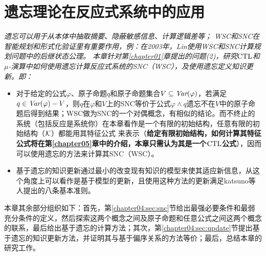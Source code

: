 
\chapter{遗忘理论在反应式系统中的应用}
\label{chapter04}

{\em
遗忘可以用于从本体中抽取摘要、隐蔽敏感信息、计算逻辑差等；
WSC和SNC在智能规划和形式化验证里有重要作用，例：在2003年，Lin使用WSC和SNC计算规划问题中的后继状态公理。
本章针对第\ref{chapter01}章提出的问题(2)，研究$\textrm{CTL}$和$\mu$-演算中如何使用遗忘计算反应式系统的SNC（WSC），及使用遗忘定义知识更新。即：
\begin{itemize}
	\item 对于给定的公式$\varphi$、原子命题$q$和原子命题集合$V\subseteq \textit{Var}(\varphi)$，若满足$q \in \textit{Var}(\varphi)-V$，则$q$在$\varphi$和$V$上的SNC等价于公式$\varphi \wedge q$遗忘不在$V$中的原子命题后得到结果；WSC做为SNC的一个对偶概念，有相似的结论。而不终止的系统（包括反应是系统你）在本章看作是一个有限的初始结构，任意有限的初始结构（${\cal K}$）都能用其特征公式%
	来表示（\textbf{给定有限初始结构，如何计算其特征公式将在第\ref{chapter05}章中的介绍，本章只需认为其是一个$\textrm{CTL}$公式}），因而可以使用遗忘的方法来计算其SNC（WSC）。
	\item 基于遗忘的知识更新通过最小的改变现有知识的模型来使其适应新信息，从这个角度上可以看作是基于模型的更新，且使用这种方法的更新满足katsuno等人提出的八条基本准则\cite{katsuno91mendelzon}。
\end{itemize}


本章其余部分组织如下：首先，第\ref{chapter04:sec:snc}节给出最强必要条件和最弱充分条件的定义，然后探索这两个概念之间及原子命题和任意公式之间这两个概念的联系，最后给出基于遗忘的计算方法；其次，第\ref{chapter04:sec:update}节提出基于遗忘的知识更新方法，并证明其与基于偏序关系的方法等价；最后，总结本章的研究工作。}

